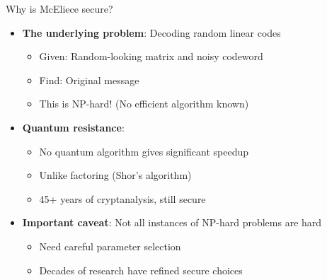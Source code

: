 \documentclass[aspectratio=169, lualatex, handout]{beamer}
\begin{document}
\begin{frame}{Why is McEliece secure?}
	\begin{itemize}
		\item \textbf{The underlying problem}: Decoding random linear codes
		      \begin{itemize}
			      \item Given: Random-looking matrix and noisy codeword
			      \item Find: Original message
			      \item This is NP-hard! (No efficient algorithm known)
		      \end{itemize}
		\item \textbf{Quantum resistance}:
		      \begin{itemize}
			      \item No quantum algorithm gives significant speedup
			      \item Unlike factoring (Shor's algorithm)
			      \item 45+ years of cryptanalysis, still secure
		      \end{itemize}
		\item \textbf{Important caveat}: Not all instances of NP-hard problems are hard
		      \begin{itemize}
			      \item Need careful parameter selection
			      \item Decades of research have refined secure choices
		      \end{itemize}
	\end{itemize}
\end{frame}
\end{document}
